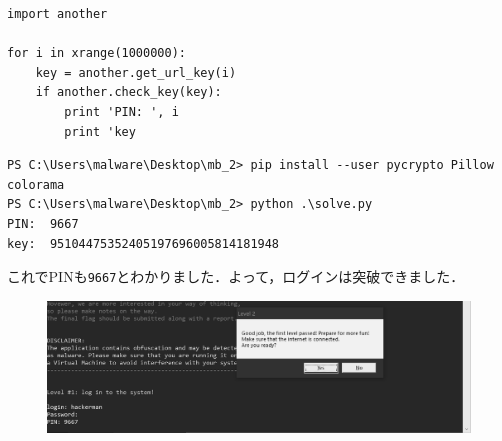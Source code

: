 \begin{tcolorbox}[title=作成したソルバーと実行結果, sharp corners, left=2mm]\scriptsize
\begin{verbatim}
import another

for i in xrange(1000000):
    key = another.get_url_key(i)
    if another.check_key(key):
        print 'PIN: ', i
        print 'key
\end{verbatim}
\begin{verbatim}
PS C:\Users\malware\Desktop\mb_2> pip install --user pycrypto Pillow colorama
PS C:\Users\malware\Desktop\mb_2> python .\solve.py
PIN:  9667
key:  95104475352405197696005814181948
\end{verbatim}
\end{tcolorbox}
これでPINも\texttt{9667}とわかりました．よって，ログインは突破できました\faChild ．
\begin{figure}[H]
    \centering
    \includegraphics[width=\linewidth]{./assets/takuzoo3868asset/crack_level1_gray.png}
    \label{fig:crack_level1}
\end{figure}


